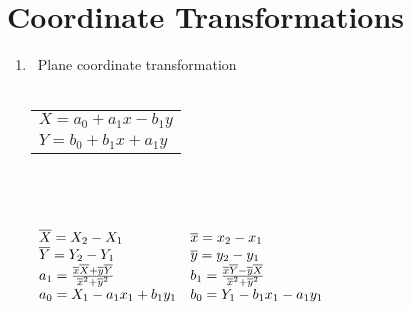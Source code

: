 \documentclass[12pt]{article}
\begin{document}
\section{Coordinate Transformations}

\begin{enumerate}
\item\ Plane coordinate transformation\\
\\
\begin{tabular}{|l|}
\hline
$ X = a_{0} + a_{1}x - b_{1}y $ \\ 
$ Y = b_{0} + b_{1}x + a_{1}y $ \\ 
\hline
\end{tabular} 
\\
\\ 
\\
$
\begin{array}{ll}
\overline{X} = X_{2} - X_{1} & 
\overline{x} = x_{2} - x_{1}\\
\overline{Y} = Y_{2} - Y_{1} & 
\overline{y} = y_{2} - y_{1}\\
a_{1} = \frac{\overline{x}\overline{X} + \overline{y}\overline{Y}}
             {\overline{x}^{2} + \overline{y}^{2}} &
b_{1} = \frac{\overline{x}\overline{Y} - \overline{y}\overline{X}}
             {\overline{x}^{2} + \overline{y}^{2}}\\          
a_{0} = X_{1} - a_{1}x_{1} + b_{1}y_{1} &
b_{0} = Y_{1} - b_{1}x_{1} - a_{1}y_{1}\\
\end{array}
\\
$


\end{enumerate}
\end{document}
